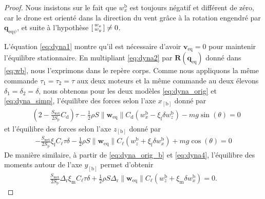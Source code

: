\begin{proof}
        Nous insistons sur le fait que $w_{x}^{\text{b}}$ est toujours négatif et différent de zéro, car le drone est orienté dans la direction du vent grâce à la rotation engendré par $ \boldsymbol{q}_{\mathrm{eq}\psi}$, et suite à l'hypothèse $\left[ \begin{smallmatrix}w_x \\ w_y \end{smallmatrix} \right] \neq 0$.
    
        L'équation \eqref{eq:dyna1} montre qu'il est nécessaire d'avoir $\boldsymbol{v}_{\text{eq}} = 0$ pour maintenir l'équilibre stationnaire. En multipliant \eqref{eq:dyna2} par $\boldsymbol{R}(\boldsymbol{q}_{\text{eq}})$ donné dans  \eqref{eq:wb}, nous l'exprimons dans le repère corps.
        Comme nous appliquons la même commande $\tau_{1} = \tau_{2} = \tau $ aux deux moteurs et la même commande au deux élevons $\delta_{1} = \delta_{2} = \delta$, nous obtenons pour les deux modèles \eqref{eq:dyna_orig} et \eqref{eq:dyna_simp}, l'équilibre des forces selon l'axe $x_{[\text{b}]}$ donné par
        \begin{align}
            & (2-\frac{S_{\text{wet}}}{2S_{\text{p}}} C_{\text{d}})\tau - \frac{1}{2}\rho S \lVert \boldsymbol{w}_{\mathrm{eq}} \rVert C_{\text{d}} \left(w_{x}^{\text{b}} - \xi_{\text{f}} \delta w_{z}^{\text{b}} \right) - mg \sin(\theta) = 0 \label{eq:forcex}
        \end{align}
        et l'équilibre des forces selon l'axe $z_{[\text{b}]}$ donné par
        \begin{align}\label{eq:forcez}
            - \frac{S_{\text{wet}}}{2S_{\text{p}}}\xi_{\text{f}} C_{\ell} \tau \delta - \frac{1}{2}\rho S \lVert \boldsymbol{w}_{\mathrm{eq}} \rVert C_{\ell} \left(w_{z}^{\text{b}} + \xi_{\text{f}} \delta w_{x}^{\text{b}} \right) + mg \cos(\theta) = 0
        \end{align}
        De manière similaire, à partir de \eqref{eq:dyna_orig_b} et \eqref{eq:dyna4}, l'équilibre des moments autour de l'axe $y_{[\text{b}]}$ permet d'obtenir
        \begin{align}\label{eq:momenty}
            \frac{S_{\text{wet}}}{2S_{\text{p}}}  \Delta_{\text{r}} \xi_{\text{m}} C_{\ell} \tau \delta + \frac{1}{2}\rho S \Delta_{\text{r}} \lVert \boldsymbol{w}_{\mathrm{eq}} \rVert C_{\ell} \left(w_{z}^{\text{b}} + \xi_{\text{m}} \delta w_{x}^{\text{b}} \right) = 0.
        \end{align}
        

\end{proof}
